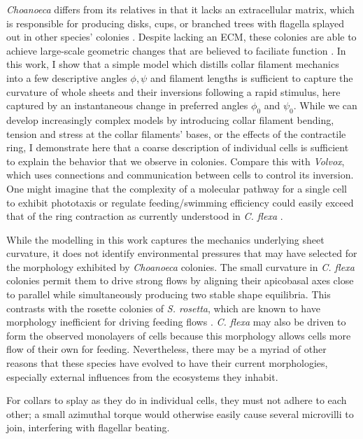 \textit{Choanoeca} differs from its relatives in that it lacks an extracellular matrix, which is responsible for producing disks, cups, or branched trees with flagella splayed out in other species' colonies \citep{larson2020}. 
Despite lacking an ECM, these colonies are able to achieve large-scale geometric changes that are believed to faciliate function \citep{brunet2019}.
In this work, I show that a simple model which distills collar filament mechanics into a few descriptive angles $\phi, \psi$ and filament lengths is sufficient to capture the curvature of whole sheets and their inversions following a rapid stimulus, here captured by an instantaneous change in preferred angles $\phi_0$ and $\psi_0$.
While we can develop increasingly complex models by introducing collar filament bending, tension and stress at the collar filaments' bases, or the effects of the contractile ring, I demonstrate here that a coarse description of individual cells is sufficient to explain the behavior that we observe in colonies. 
Compare this with \textit{Volvox}, which uses connections and communication between cells to control its inversion. 
One might imagine that the complexity of a molecular pathway for a single cell to exhibit phototaxis or regulate feeding/swimming efficiency could easily exceed that of the ring contraction as currently understood in \textit{C. flexa} \citep{brunet2019}. 

While the modelling in this work captures the mechanics underlying sheet curvature, it does not identify environmental pressures that may have selected for the morphology exhibited by \textit{Choanoeca} colonies.
The small curvature in \textit{C. flexa} colonies permit them to drive strong flows by aligning their apicobasal axes close to parallel while simultaneously producing two stable shape equilibria.
This contrasts with the rosette colonies of \textit{S. rosetta}, which are known to have morphology inefficient for driving feeding flows \citep{kirkegaard2016}.
\textit{C. flexa} may also be driven to form the observed monolayers of cells because this morphology allows cells more flow of their own for feeding.
Nevertheless, there may be a myriad of other reasons that these species have evolved to have their current morphologies, especially external influences from the ecosystems they inhabit.

For collars to splay as they do in individual cells, they must not adhere to each other; a small azimuthal torque would otherwise easily cause several microvilli to join, interfering with flagellar beating.

